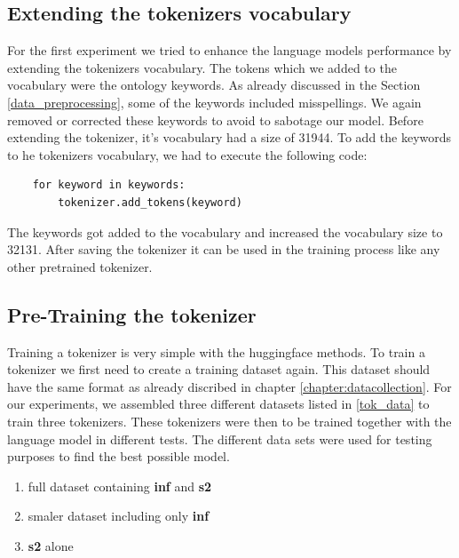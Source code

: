 \subsection{Extending the tokenizers vocabulary}
For the first experiment we tried to enhance the language models performance by extending the tokenizers vocabulary. The tokens which we added to the vocabulary were the ontology keywords. As already discussed in the Section \ref{data_preprocessing}, some of the keywords included misspellings. We again removed or corrected these keywords to avoid to sabotage our model. \newline
Before extending the tokenizer, it's vocabulary had a size of 31944. To add the keywords to he tokenizers vocabulary, we had to execute the following code:

\begin{code}
	\label{code:extend_tokenizer}
\begin{verbatim}
	for keyword in keywords:
		tokenizer.add_tokens(keyword)
\end{verbatim}
\end{code}

The keywords got added to the vocabulary and increased the vocabulary size to 32131. After saving the tokenizer it can be used in the training process like any other pretrained tokenizer.

\subsection{Pre-Training the tokenizer}\label{chapter:training-tokenizer}
Training a tokenizer is very simple with the \alert{ huggingface} methods. To train a tokenizer we first need to create a training dataset again. This dataset should have the same format as already discribed in chapter \ref{chapter:datacollection}. For our experiments, we assembled three different datasets listed in \ref{tok_data} to train three tokenizers. These tokenizers were then to be trained together with the language model in different tests. The different data sets were used for testing purposes to find the best possible model. 

\begin{enumerate} \label{tok_data}
	\item full dataset containing \textbf{inf} and \textbf{s2}
	\item smaler dataset including only \textbf{inf}
	\item \textbf{s2} alone
\end{enumerate}

